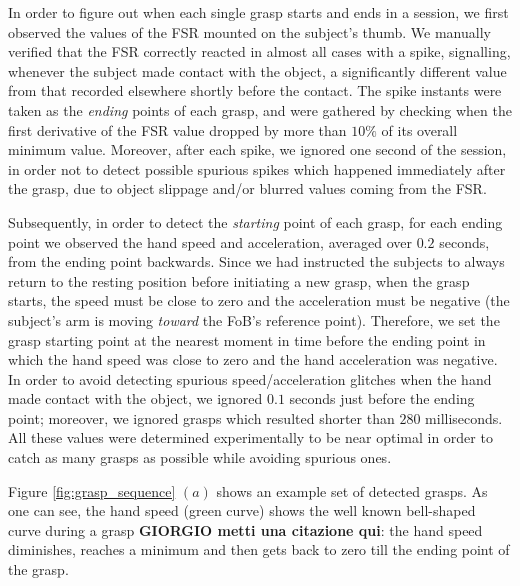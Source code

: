 In order to figure out when each single grasp starts and ends in a
session, we first observed the values of the FSR mounted on the
subject's thumb. We manually verified that the FSR correctly reacted
in almost all cases with a spike, signalling, whenever the subject
made contact with the object, a significantly different value from
that recorded elsewhere shortly before the contact. The spike instants
were taken as the \emph{ending} points of each grasp, and were
gathered by checking when the first derivative of the FSR value
dropped by more than $10\%$ of its overall minimum value. Moreover,
after each spike, we ignored one second of the session, in order not
to detect possible spurious spikes which happened immediately after
the grasp, due to object slippage and/or blurred values coming from
the FSR.

Subsequently, in order to detect the \emph{starting} point of each
grasp, for each ending point we observed the hand speed and
acceleration, averaged over $0.2$ seconds, from the ending point
backwards. Since we had instructed the subjects to always return to
the resting position before initiating a new grasp, when the grasp
starts, the speed must be close to zero and the acceleration must be
negative (the subject's arm is moving \emph{toward} the FoB's
reference point). Therefore, we set the grasp starting point at the
nearest moment in time before the ending point in which the hand speed
was close to zero and the hand acceleration was negative. In order to
avoid detecting spurious speed/acceleration glitches when the hand
made contact with the object, we ignored $0.1$ seconds just before the
ending point; moreover, we ignored grasps which resulted shorter than
$280$ milliseconds. All these values were determined experimentally to
be near optimal in order to catch as many grasps as possible while
avoiding spurious ones.

Figure \ref{fig:grasp_sequence} $(a)$ shows an example set of detected
grasps. As one can see, the hand speed (green curve) shows the well
known bell-shaped curve during a grasp \cite{...} {\bf GIORGIO metti
una citazione qui}: the hand speed diminishes, reaches a minimum and
then gets back to zero till the ending point of the grasp.

